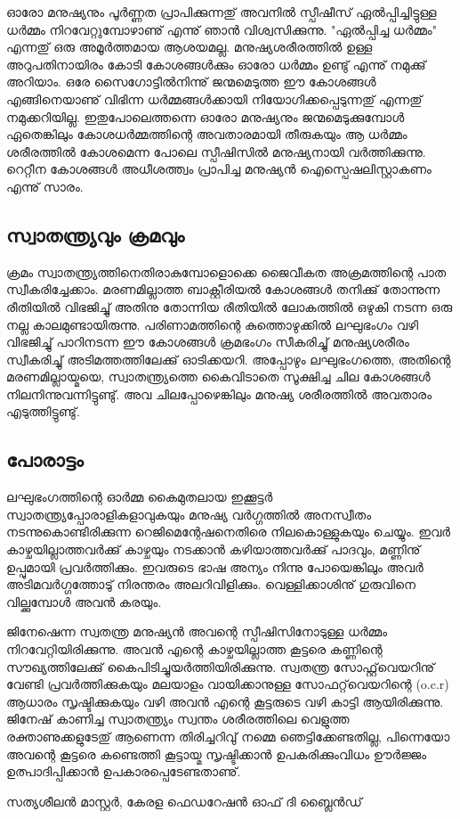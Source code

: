\newpage
{}
ഓരോ മനുഷ്യനും പൂര്‍ണ്ണത പ്രാപിക്കുന്നതു് അവനില്‍ സ്പീഷീസ് ഏല്‍പ്പിച്ചിട്ടുള്ള ധര്‍മ്മം നിറവേറ്റുമ്പോഴാണു് എന്നു് ഞാന്‍ വിശ്വസിക്കുന്നു. "ഏല്‍പ്പിച്ച ധര്‍മ്മം" എന്നതു് ഒരു അമൂര്‍ത്തമായ ആശയമല്ല. മനുഷ്യശരീരത്തില്‍ ഉള്ള അറുപതിനായിരം കോടി കോശങ്ങള്‍ക്കും ഓരോ ധര്‍മ്മം ഉണ്ടു് എന്നു് നമുക്കു് അറിയാം. ഒരേ സൈഗോട്ടില്‍നിന്നു് ജന്മമെടുത്ത ഈ കോശങ്ങള്‍ എങ്ങിനെയാണു്
വിഭിന്ന ധര്‍മ്മങ്ങള്‍ക്കായി നിയോഗിക്കപ്പെടുന്നതു് എന്നതു് നമുക്കറിയില്ല. ഇതുപോലെത്തന്നെ ഓരോ മനുഷ്യനും ജന്മമെടുക്കുമ്പോള്‍ ഏതെങ്കിലും കോശധര്‍മ്മത്തിന്റെ അവതാരമായി തീരുകയും ആ ധര്‍മ്മം ശരീരത്തില്‍ കോശമെന്ന പോലെ സ്പീഷിസില്‍ മനുഷ്യനായി
വര്‍ത്തിക്കുന്നു. റെറ്റീന കോശങ്ങള്‍ അധീശത്ത്വം പ്രാപിച്ച മനുഷ്യന്‍ ഐസ്പെഷലിസ്റ്റാകണം എന്നു് സാരം.

\subsection*{സ്വാതന്ത്ര്യവും ക്രമവും}
ക്രമം സ്വാതന്ത്ര്യത്തിനെതിരാകുമ്പോളൊക്കെ ജൈവീകത അക്രമത്തിന്റെ പാത സ്വീകരിച്ചേക്കാം. മരണമില്ലാത്ത ബാക്റ്റീരിയല്‍ കോശങ്ങള്‍ തനിക്കു് തോന്നുന്ന രീതിയില്‍ വിഭജിച്ചു് അതിനു തോന്നിയ രീതിയില്‍ ലോകത്തില്‍ ഒഴുകി നടന്ന ഒരു നല്ല കാലമുണ്ടായിരുന്നു. പരിണാമത്തിന്റെ കുത്തൊഴുക്കില്‍ ലഘുഭംഗം വഴി വിഭജിച്ചു് പാറിനടന്ന ഈ കോശങ്ങള്‍ ക്രമഭംഗം സീകരിച്ചു് മനുഷ്യശരീരം സ്വീകരിച്ചു് അടിമത്തത്തിലേക്കു് ഓടിക്കയറി. അപ്പോഴും ലഘുഭംഗത്തെ, അതിന്റെ മരണമില്ലായ്മയെ, സ്വാതന്ത്ര്യത്തെ കൈവിടാതെ സൂക്ഷിച്ച ചില കോശങ്ങള്‍ നിലനിന്നുവന്നിട്ടുണ്ടു്. അവ ചിലപ്പോഴെങ്കിലും മനുഷ്യ ശരീരത്തില്‍ അവതാരം എടുത്തിട്ടുണ്ടു്.

\subsection*{പോരാട്ടം}
ലഘുഭംഗത്തിന്റെ ഓര്‍മ്മ കൈമുതലായ ഇക്കൂട്ടര്‍ സ്വാതന്ത്ര്യപ്പോരാളികളാവുകയും മനുഷ്യ വര്‍ഗ്ഗത്തില്‍ അനസ്വീതം നടന്നുകൊണ്ടിരിക്കുന്ന റെജിമെന്റേഷനെതിരെ നിലകൊള്ളുകയും ചെയ്യും.
ഇവര്‍ കാഴ്ചയില്ലാത്തവര്‍ക്കു് കാഴ്ചയും നടക്കാന്‍ കഴിയാത്തവര്‍ക്കു് പാദവും, മണ്ണിനു് ഉപ്പുമായി പ്രവര്‍ത്തിക്കും. ഇവരുടെ ഭാഷ അന്യം നിന്നു പോയെങ്കിലും
അവര്‍ അടിമവര്‍ഗ്ഗത്തോടു് നിരന്തരം അലറിവിളിക്കും. വെള്ളിക്കാശിനു് ഗുരുവിനെ വില്ക്കുമ്പോള്‍ അവന്‍ കരയും.

ജിനേഷെന്ന സ്വതന്ത്ര മനുഷ്യന്‍ അവന്റെ സ്പീഷിസിനോടുള്ള ധര്‍മ്മം നിറവേറ്റിയിരിക്കുന്നു. അവന്‍ എന്റെ കാഴ്ചയില്ലാത്ത കൂട്ടരെ കണ്ണിന്റെ സൗഖ്യത്തിലേക്കു് കൈപിടിച്ചുയര്‍ത്തിയിരിക്കുന്നു. സ്വതന്ത്ര സോഫ്റ്റ്‌വെയറിനു് വേണ്ടി പ്രവര്‍ത്തിക്കുകയും മലയാളം വായിക്കാനുള്ള സോഫറ്റ്‌വെയറിന്റെ (o.c.r) ആധാരം സൃഷ്ടിക്കുകയും വഴി അവന്‍ എന്റെ കൂട്ടരുടെ വഴി കാട്ടി ആയിരിക്കുന്നു.
ജിനേഷ് കാണിച്ച സ്വാതന്ത്ര്യം സ്വന്തം ശരീരത്തിലെ വെളുത്ത രക്താണുക്കളുടേതു് ആണെന്ന തിരിച്ചറിവു് നമ്മെ ഞെട്ടിക്കേണ്ടതില്ല, പിന്നെയോ അവന്റെ കൂട്ടരെ കണ്ടെത്തി കൂട്ടായ്മ സൃഷ്ടിക്കാന്‍ ഉപകരിക്കുംവിധം ഊര്‍ജ്ജം ഉത്പാദിപ്പിക്കാന്‍ ഉപകാരപ്പെടേണ്ടതാണു്.

\begin{flushright}സത്യശീലന്‍ മാസ്റ്റര്‍, കേരള ഫെഡറേഷന്‍ ഓഫ് ദി ബ്ലൈന്‍ഡ്\end{flushright}
